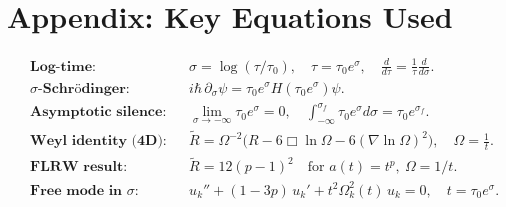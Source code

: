 \documentclass[11pt]{article}
\begin{document}
\section*{Appendix: Key Equations Used}
\begin{align*}
&\textbf{Log-time:} && \sigma=\log(\tau/\tau_0), \quad \tau=\tau_0 e^\sigma,
\quad \frac{d}{d\tau}=\frac{1}{\tau}\frac{d}{d\sigma}. \\
&\textbf{$\sigma$-Schr\"odinger:} &&
i\hbar\,\partial_\sigma \psi=\tau_0 e^\sigma H(\tau_0 e^\sigma)\psi.\\
&\textbf{Asymptotic silence:} &&
\lim_{\sigma\to-\infty}\tau_0 e^\sigma=0,\quad
\int_{-\infty}^{\sigma_f}\tau_0 e^\sigma d\sigma=\tau_0 e^{\sigma_f}.\\
&\textbf{Weyl identity (4D):} &&
\tilde R=\Omega^{-2}\big(R-6\Box\ln\Omega-6(\nabla\ln\Omega)^2\big),\quad
\Omega=\tfrac{1}{t}.\\
&\textbf{FLRW result:} &&
\tilde R=12(p-1)^2\quad\text{for } a(t)=t^p,\ \Omega=1/t.\\
&\textbf{Free mode in $\sigma$:} &&
u_k''+(1-3p)\,u_k'+t^2\Omega_k^2(t)\,u_k=0,\quad t=\tau_0 e^\sigma.
\end{align*}
\end{document}
